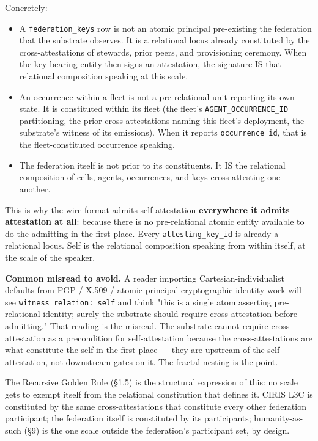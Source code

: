 \documentclass[10pt]{article}
\begin{document}
Concretely:


\begin{itemize}\setlength\itemsep{0pt}
\item A \texttt{federation\_keys} row is not an atomic principal pre-existing the federation that the substrate observes. It is a relational locus already constituted by the cross-attestations of stewards, prior peers, and provisioning ceremony. When the key-bearing entity then signs an attestation, the signature IS that relational composition speaking at this scale.
\item An occurrence within a fleet is not a pre-relational unit reporting its own state. It is constituted within its fleet (the fleet's \texttt{AGENT\_OCCURRENCE\_ID} partitioning, the prior cross-attestations naming this fleet's deployment, the substrate's witness of its emissions). When it reports \texttt{occurrence\_id}, that is the fleet-constituted occurrence speaking.
\item The federation itself is not prior to its constituents. It IS the relational composition of cells, agents, occurrences, and keys cross-attesting one another.
\end{itemize}


This is why the wire format admits self-attestation \textbf{everywhere it admits attestation at all}: because there is no pre-relational atomic entity available to do the admitting in the first place. Every \texttt{attesting\_key\_id} is already a relational locus. Self is the relational composition speaking from within itself, at the scale of the speaker.


\textbf{Common misread to avoid.} A reader importing Cartesian-individualist defaults from PGP / X.509 / atomic-principal cryptographic identity work will see \texttt{witness\_relation: self} and think "this is a single atom asserting pre-relational identity; surely the substrate should require cross-attestation before admitting." That reading is the misread. The substrate cannot require cross-attestation as a precondition for self-attestation because the cross-attestations are what constitute the self in the first place — they are upstream of the self-attestation, not downstream gates on it. The fractal nesting is the point.


The Recursive Golden Rule (§1.5) is the structural expression of this: no scale gets to exempt itself from the relational constitution that defines it. CIRIS L3C is constituted by the same cross-attestations that constitute every other federation participant; the federation itself is constituted by its participants; humanity-as-such (§9) is the one scale outside the federation's participant set, by design.
\end{document}
